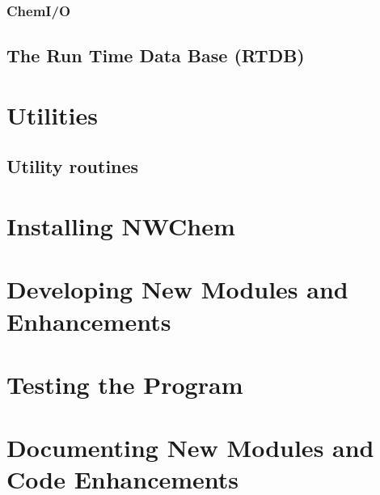 \subsection{ChemI/O}

\section{The Run Time Data Base (RTDB)}


\chapter{Utilities}



\section{Utility routines}



\chapter{Installing NWChem}




\chapter{Developing New Modules and Enhancements}




\chapter{Testing the Program}


\chapter{Documenting New Modules and Code Enhancements}

%


